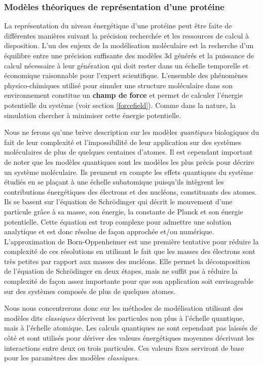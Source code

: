 \subsubsection{Modèles théoriques de représentation d'une protéine}

La représentation du niveau énergétique d'une protéine peut être faite de différentes manières suivant la précision recherchée et les ressources de calcul à disposition. L'un des enjeux de la modélisation moléculaire est la recherche d'un équilibre entre une précision suffisante des modèles 3d générés et la puissance de calcul nécessaire à leur génération qui doit rester dans un échelle temporelle et économique raisonnable pour l'expert scientifique.
L'ensemble des phénomènes physico-chimiques utilisé pour simuler une structure moléculaire dans son environnement constitue un \textbf{champ de force} et permet de calculer l'énergie potentielle du système (voir section \ref{forcefield}). Comme dans la nature, la simulation chercher à minimiser cette énergie potentielle.

 \label{quantic}

Nous ne ferons qu'une brève description sur les modèles \textit{quantiques} biologiques du fait de leur complexité et l'impossibilité de leur application sur des systèmes moléculaires de plus de quelques centaines d'atomes. Il est cependant important de noter que les modèles quantiques sont les modèles les plus précis pour décrire un système moléculaire. Ils prennent en compte les effets quantiques du système étudiés en se plaçant à une échelle subatomique puisqu'ils intègrent les contributions énergétiques des électrons et des nucléons, constituants des atomes. Ils se basent sur l'équation de Schrödinger \cite{schrodinger1926undulatory} qui décrit le mouvement d'une particule grâce à sa masse, son énergie, la constante de Planck et son énergie potentielle. Cette équation est trop complexe pour admettre une solution analytique et est donc résolue de façon approchée et/ou numérique. L'approximation de Born-Oppenheimer \cite{born1927quantentheorie} est une première tentative pour réduire la complexité de ces résolutions en utilisant le fait que les masses des électrons sont très petites par rapport aux masses des nucléons. Elle permet la décomposition de l'équation de Schrödinger en deux étapes, mais ne suffit pas à réduire la complexité de façon assez importante pour que son application soit envisageable sur des systèmes composés de plus de quelques atomes.

Nous nous concentrerons donc sur les méthodes de modélisation utilisant des modèles dits \textit{classiques} décrivent les particules non plus à l'échelle quantique, mais à l'échelle atomique. Les calculs quantiques ne sont cependant pas laissés de côté et sont utilisés pour dériver des valeurs énergétiques moyennes décrivant les interactions entre deux ou trois particules. Ces valeurs fixes serviront de base pour les paramètres des modèles \textit{classiques}.

